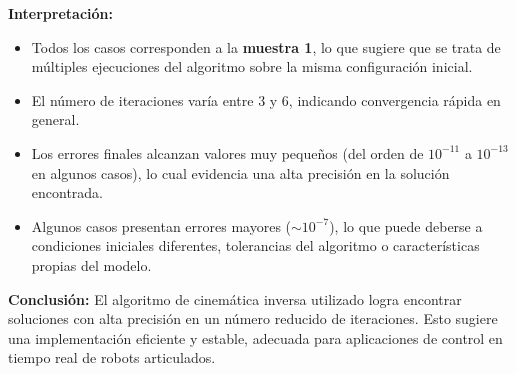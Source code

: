	\textbf{Interpretación:}
	\begin{itemize}
		\item Todos los casos corresponden a la \textbf{muestra 1}, lo que sugiere que se trata de múltiples ejecuciones del algoritmo sobre la misma configuración inicial.
		\item El número de iteraciones varía entre 3 y 6, indicando convergencia rápida en general.
		\item Los errores finales alcanzan valores muy pequeños (del orden de $10^{-11}$ a $10^{-13}$ en algunos casos), lo cual evidencia una alta precisión en la solución encontrada.
		\item Algunos casos presentan errores mayores ($\sim10^{-7}$), lo que puede deberse a condiciones iniciales diferentes, tolerancias del algoritmo o características propias del modelo.
	\end{itemize}
	
	\vspace{0.5cm}
	
	\textbf{Conclusión:}  
	El algoritmo de cinemática inversa utilizado logra encontrar soluciones con alta precisión en un número reducido de iteraciones. Esto sugiere una implementación eficiente y estable, adecuada para aplicaciones de control en tiempo real de robots articulados.
	

